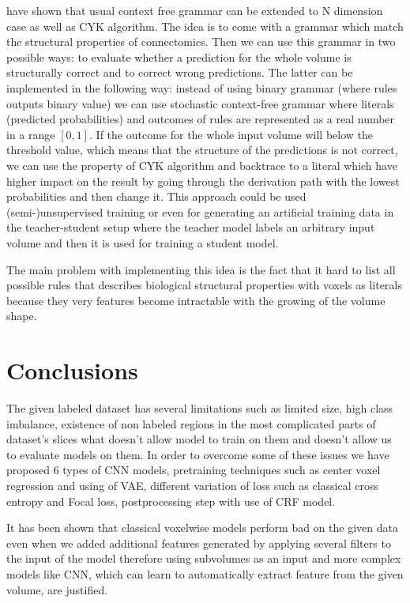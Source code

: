 \documentclass[twocolumn, a4paper]{article}
\theoremstyle{definition}
\begin{document}
\cite{schlesinger2013ten} have shown that usual context free grammar can be extended to N dimension
case as well as CYK algorithm. The idea is to come with a grammar which match the structural properties of
connectomics. Then we can use this grammar in two possible ways: to evaluate whether
a prediction for the whole volume is structurally correct and to correct wrong predictions.
The latter can be implemented in the following way: instead of using binary grammar (where rules outputs binary value) we can use stochastic context-free grammar where literals (predicted probabilities)
and outcomes of rules are represented as a real number in a range \( [0, 1] \). If the outcome for the whole input volume will below the threshold
value, which means that the structure of the predictions is not correct, we can use the property of CYK algorithm and backtrace
to a literal which have higher impact on the result by going through the derivation path with the lowest probabilities and then change it.
This approach could be used (semi-)unsupervised training or even for generating an artificial training data in the teacher-student setup where the teacher model
labels an arbitrary input volume and then it is used for training a student model.

The main problem with implementing this idea is the fact that it hard to list all possible rules that describes
biological structural properties with voxels as literals because they very features become intractable with the growing of
the volume shape.

\section{Conclusions}

The given labeled dataset has several limitations such as limited size, high class imbalance, existence of non labeled regions
in the most complicated parts of dataset's slices what doesn't allow model to train on them and doesn't allow us to evaluate models on them.
In order to overcome some of these issues we have proposed 6 types of CNN models, pretraining techniques such as center voxel regression and
using of VAE, different variation of loss such as classical cross entropy and Focal loss, postprocessing step with use
of CRF model.

It has been shown that classical voxelwise models perform bad on the given data even when we added
additional features generated by applying several filters to the input of the model therefore using subvolumes as
an input and more complex models like CNN, which can learn to automatically extract feature from the given volume,
are justified.
\end{document}
